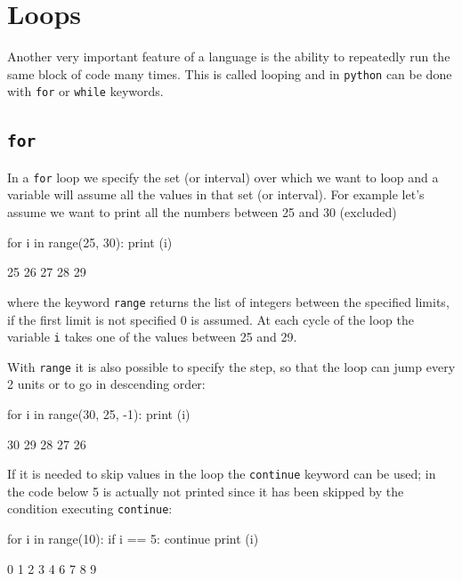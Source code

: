\section{Loops}\label{loops}

Another very important feature of a language is the ability to repeatedly run the same block of code many times. This is called looping and in \texttt{python} can be done with \texttt{for} or \texttt{while} keywords.

\subsection{\texttt{for}}\label{for}

In a \texttt{for} loop we specify the set (or interval) over which we want to loop and a variable will assume all the values in that set (or interval). For example let's assume we want to print all the numbers between 25 and 30 (excluded) 

\begin{ipythonnon}
for i in range(25, 30):
    print (i)	
\end{ipythonnon}
\begin{ioutput}
25
26
27
28
29	
\end{ioutput}
\noindent
where the keyword \texttt{range} returns the list of integers between the specified limits, if the first limit is not specified 0 is assumed.
At each cycle of the loop the variable \texttt{i} takes one of the values between 25 and 29. 

With \texttt{range} it is also possible to specify the step, so that the loop can jump every 2 units or to go in descending order:

\begin{ipythonnon}
for i in range(30, 25, -1):
    print (i)	
\end{ipythonnon}
\begin{ioutput}
30
29
28
27
26	
\end{ioutput}

If it is needed to skip values in the loop the \texttt{continue} keyword can be used; in the code below 5 is actually not printed since it has been skipped by the condition executing \texttt{continue}:

\begin{ipythonnon}
for i in range(10):
    if i == 5:
        continue
    print (i)	
\end{ipythonnon}
\begin{ioutput}
0
1
2
3
4
6
7
8
9	
\end{ioutput}

